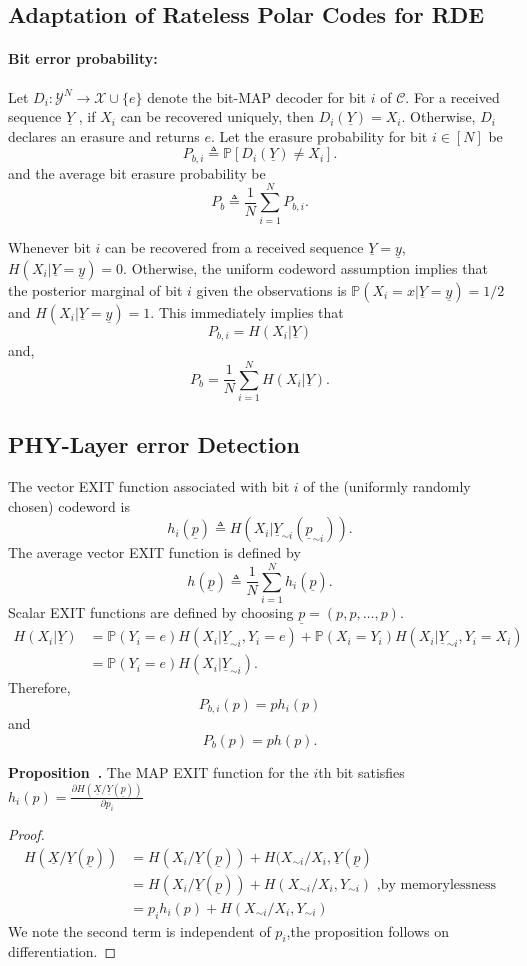 \documentclass[
11pt, %
a4paper, %
oneside, %
headinclude,footinclude, %
BCOR5mm, %
]{scrartcl}
\newenvironment{proposition}[1][]{\refstepcounter{definition}\par\medskip
   \noindent \textbf{Proposition~\thedefinition. #1} \rmfamily}{\medskip}
\begin{document}
\subsection{Adaptation of Rateless Polar Codes for RDE} 
\paragraph*{Bit error probability:}Let $D_i : \mathcal{Y}^N \to \mathcal{X} \cup \{e\}$ denote the bit-MAP decoder for bit $i$ of $\mathcal{C}$. For a received sequence $\underline{Y}$ , if $X_i$ can be recovered uniquely, then $D_i(\underline{Y}) = X_i$. Otherwise, $D_i$ declares an erasure and returns $e$. Let the erasure probability for bit $i \in [N]$ be $$P_{b,i} \triangleq \mathbb{P}[D_i(\underline{Y}) \neq X_i].$$ and the average bit erasure probability be $$P_b \triangleq \frac{1}{N}\sum_{i=1}^N P_{b,i}.$$

Whenever bit $i$ can be recovered from a received sequence $\underline{Y}=\underline{y}$, $H(X_i | \underline{Y}=\underline{y}) = 0$. Otherwise, the uniform codeword assumption implies that the posterior marginal of bit $i$ given the observations is $\mathbb{P}(X_i = x|\underline{Y}=\underline{y}) = 1/2$ and $H(X_i |\underline{Y}=\underline{y}) = 1$. This immediately implies that $$P_{b,i} = H(X_i|\underline{Y})$$ and, $$P_b = \frac{1}{N}\sum_{i=1}^N  H(X_i|\underline{Y}).$$

\subsection{PHY-Layer error Detection} The vector EXIT function associated with bit $i$ of the (uniformly randomly chosen) codeword is $$h_i(\underline{p})\triangleq H(X_i | \underline{Y}_{\sim i}(\underline{p}_{\sim i})).$$ The average vector EXIT function is defined by $$h(\underline{p}) \triangleq \frac{1}{N}\sum_{i=1}^N h_i(\underline{p}).$$ Scalar EXIT functions are defined by choosing $\underline{p}=(p,p,\ldots,p)$.
\begin{align*}
H(X_i|\underline{Y}) &= \mathbb{P}(Y_i=e)H(X_i|\underline{Y}_{\sim i}, Y_i=e) + \mathbb{P}(X_i=Y_i)H(X_i|\underline{Y}_{\sim i}, Y_i=X_i)\\
&= \mathbb{P}(Y_i=e)H(X_i|\underline{Y}_{\sim i}).
\end{align*}
Therefore, $$P_{b,i}(p) = ph_i(p)$$ and $$P_b(p) = ph(p).$$
\begin{proposition}
The MAP EXIT function for the $i$th bit satisfies $h_i(p)=
\frac{\partial H(\underline{X}/\underline{Y}(\underline{p}))}{\partial p_i} $
\begin{proof}
\begin{align*}
H(\underline{X}/\underline{Y}(\underline{p})) &= H(X_i/\underline{Y}(\underline{p}))+H(X_{\sim i}/X_i,\underline{Y}(\underline{p})\\
&=H(X_i/\underline{Y}(\underline{p}))+H(X_{\sim i}/X_i,Y_{\sim i})  \text{ ,by memorylessness}\\
&=p_ih_i(p)+H(X_{\sim i}/X_i,Y_{\sim i}) 
\end{align*}
We note the second term is independent of $p_{i}$,the proposition follows on differentiation.
\end{proof}
\label{propn1}
\end{proposition}
\end{document}
